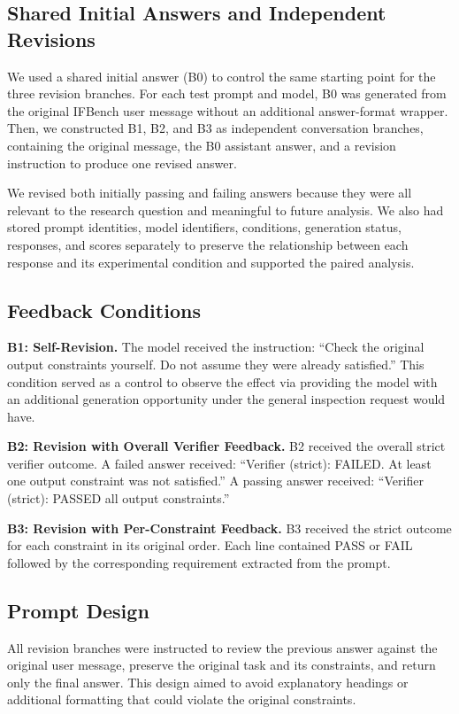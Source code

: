 \documentclass[conference]{IEEEtran}
\begin{document}
\subsection{Shared Initial Answers and Independent Revisions}
We used a shared initial answer (B0) to control the same starting point for the three revision branches. For each test prompt and model, B0 was generated from the original IFBench user message without an additional answer-format wrapper. Then, we constructed B1, B2, and B3 as independent conversation branches, containing the original message, the B0 assistant answer, and a revision instruction to produce one revised answer.

We revised both initially passing and failing answers because they were all relevant to the research question and meaningful to future analysis. We also had stored prompt identities, model identifiers, conditions, generation status, responses, and scores separately to preserve the relationship between each response and its experimental condition and supported the paired analysis.
\subsection{Feedback Conditions}
\textbf{B1: Self-Revision.} The model received the instruction: ``Check the original output constraints yourself. Do not assume they were already satisfied.'' This condition served as a control to observe the effect via providing the model with an additional generation opportunity under the general inspection request would have.

\textbf{B2: Revision with Overall Verifier Feedback.} B2 received the overall strict verifier outcome. A failed answer received: ``Verifier (strict): FAILED. At least one output constraint was not satisfied.'' A passing answer received: ``Verifier (strict): PASSED all output constraints.''

\textbf{B3: Revision with Per-Constraint Feedback.} B3 received the strict outcome for each constraint in its original order. Each line contained PASS or FAIL followed by the corresponding requirement extracted from the prompt.
\subsection{Prompt Design}
All revision branches were instructed to review the previous answer against the original user message, preserve the original task and its constraints, and return only the final answer. This design aimed to avoid explanatory headings or additional formatting that could violate the original constraints.
\end{document}
